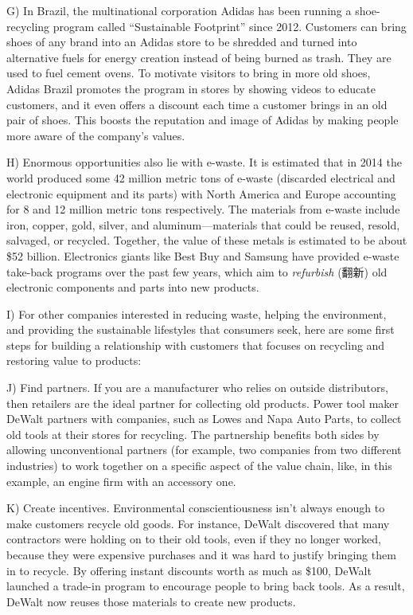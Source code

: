 \documentclass[UTF8,11pt]{ctexart}
\begin{document}
G) In Brazil, the multinational corporation Adidas has been running a shoe-recycling program called “Sustainable Footprint” since 2012. Customers can bring shoes of any brand into an Adidas store to be shredded and turned into alternative fuels for energy creation instead of being burned as trash. They are used to fuel cement ovens. To motivate visitors to bring in more old shoes, Adidas Brazil promotes the program in stores by showing videos to educate customers, and it even offers a discount each time a customer brings in an old pair of shoes. This boosts the reputation and image of Adidas by making people more aware of the company’s values.


H) Enormous opportunities also lie with e-waste. It is estimated that in 2014 the world produced some 42 million metric tons of e-waste (discarded electrical and electronic equipment and its parts) with North America and Europe accounting for 8 and 12 million metric tons respectively. The materials from e-waste include iron, copper, gold, silver, and aluminum—materials that could be reused, resold, salvaged, or recycled. Together, the value of these metals is estimated to be about \$52 billion. Electronics giants like Best Buy and Samsung have provided e-waste take-back programs over the past few years, which aim to\textit{ refurbish} (翻新) old electronic components and parts into new products.


I) For other companies interested in reducing waste, helping the environment, and providing the sustainable lifestyles that consumers seek, here are some first steps for building a relationship with customers that focuses on recycling and restoring value to products:


J) Find partners. If you are a manufacturer who relies on outside distributors, then retailers are the ideal partner for collecting old products. Power tool maker DeWalt partners with companies, such as Lowes and Napa Auto Parts, to collect old tools at their stores for recycling. The partnership benefits both sides by allowing unconventional partners (for example, two companies from two different industries) to work together on a specific aspect of the value chain, like, in this example, an engine firm with an accessory one.


K) Create incentives. Environmental conscientiousness isn’t always enough to make customers recycle old goods. For instance, DeWalt discovered that many contractors were holding on to their old tools, even if they no longer worked, because they were expensive purchases and it was hard to justify bringing them in to recycle. By offering instant discounts worth as much as \$100, DeWalt launched a trade-in program to encourage people to bring back tools. As a result, DeWalt now reuses those materials to create new products.
\end{document}
